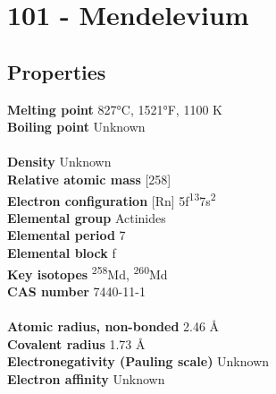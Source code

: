 \section{101 - Mendelevium}
\label{sec:elem-mendelevium}
\subsection{Properties}
\textbf{Melting point} 827°C, 1521°F, 1100 K\\
\textbf{Boiling point} Unknown\\
\\
\textbf{Density} Unknown\\
\textbf{Relative atomic mass} [258]\\
\textbf{Electron configuration} [Rn] 5f\textsuperscript{13}7s\textsuperscript{2}\\
\textbf{Elemental group} Actinides\\
\textbf{Elemental period} 7\\
\textbf{Elemental block} f\\
\textbf{Key isotopes} \textsuperscript{258}Md, \textsuperscript{260}Md\\
\textbf{CAS number} 7440-11-1\\
\\
\textbf{Atomic radius, non-bonded} 2.46 Å\\
\textbf{Covalent radius} 1.73 Å\\
\textbf{Electronegativity (Pauling scale)} Unknown\\
\textbf{Electron affinity} Unknown\\